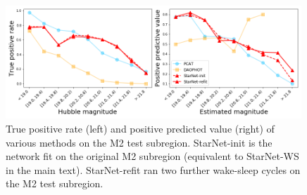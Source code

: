 \begin{figure}[ht]
    \centering
    \includegraphics[width=0.99\textwidth]{figures/m2_test/summary_statistics_m2.png}
    \caption{True positive rate (left) and positive predicted value (right) of various methods on the M2 test subregion. 
    StarNet-init is the network fit on the original M2 subregion (equivalent to StarNet-WS in the main text). 
StarNet-refit ran two further wake-sleep cycles on the M2 test subregion. 
    }
    \label{fig:summary_stats_m2test}
\end{figure}
